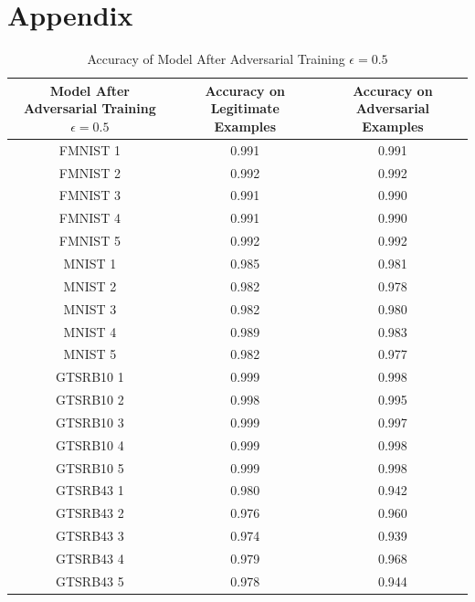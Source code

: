 \documentclass{article}
\begin{document}
\section{Appendix}
\begin{table} [htbp]
\centering
\begin{tabular}{ccc}
    \toprule
    Model After Adversarial Training \(\epsilon=0.5\) & Accuracy on Legitimate Examples & Accuracy on Adversarial Examples \\
    \midrule
    FMNIST 1 & 0.991 & 0.991 \\
    FMNIST 2 & 0.992 & 0.992 \\
    FMNIST 3 & 0.991 & 0.990 \\
    FMNIST 4 & 0.991 & 0.990 \\
    FMNIST 5 & 0.992 & 0.992 \\
    MNIST 1 & 0.985 & 0.981 \\
    MNIST 2 & 0.982 & 0.978 \\
    MNIST 3 & 0.982 & 0.980 \\
    MNIST 4 & 0.989 & 0.983 \\
    MNIST 5 & 0.982 & 0.977 \\
    GTSRB10 1 & 0.999 & 0.998 \\
    GTSRB10 2 & 0.998 & 0.995 \\
    GTSRB10 3 & 0.999 & 0.997 \\
    GTSRB10 4 & 0.999 & 0.998 \\
    GTSRB10 5 & 0.999 & 0.998 \\

    GTSRB43 1 & 0.980 & 0.942 \\
    GTSRB43 2 & 0.976 & 0.960 \\
    GTSRB43 3 & 0.974 & 0.939 \\
    GTSRB43 4 & 0.979 & 0.968 \\
    GTSRB43 5 & 0.978 & 0.944 \\
    \bottomrule
\end{tabular}
\caption{\label{tab:acc5adv} Accuracy of Model After Adversarial Training \(\epsilon=0.5\) }
\end{table}
\end{document}
